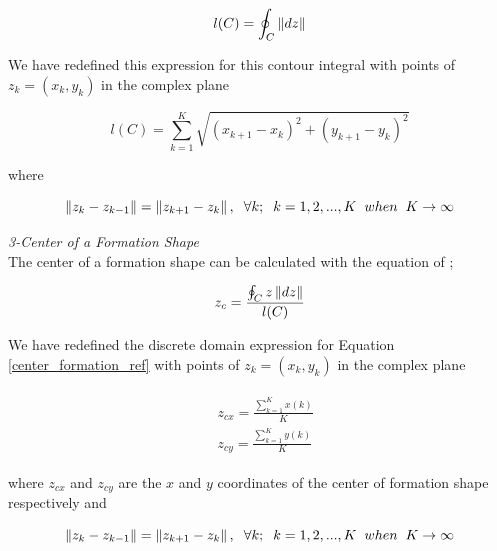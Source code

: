 \begin{equation}
l(C)= \oint_C \left\lVert dz\right\rVert
\end{equation}
		
We have redefined this expression for this contour integral with points of   $z_k = (x_k,y_k)$ in the complex plane

\begin{equation}
l(C) = \sum_{k=1}^{K}\sqrt{(x_{k+1} - x_k)^2 + (y_{k+1} - y_k)^2}
\end{equation}

where

\begin{equation}
\left\lVert z_k - z_{k-1}\right\rVert = \left\lVert z_{k+1} - z_k\right\rVert, \hspace{0.2cm}  \forall k ;  \hspace{0.2cm} k=1,2,...,K \hspace{0.2cm} when  \hspace{0.2cm} K \to\infty
\end{equation}
		
\textit{ 	3-Center of a Formation Shape} \\ 	
The center of a formation shape can be calculated with the equation of \cite{17};

\begin{equation} \label{center_formation_ref}
 z_c = \frac{\oint_C z\left\lVert dz\right\rVert}{l(C)}
\end{equation}
		
We have redefined the discrete domain expression for Equation \ref{center_formation_ref} with points of  $z_k = (x_k,y_k)$ in the complex plane

\begin{align}
\begin{split}
&z_{cx} = \frac{\sum_{k=1}^{K}x(k)}{K}  \\
&z_{cy} = \frac{\sum_{k=1}^{K}y(k)}{K}  
\end{split}
\end{align}
		
where $z_{cx}$ and $z_{cy}$ are the $x$ and $y$ coordinates of the center of formation shape respectively and

\begin{equation}
\left\lVert z_k - z_{k-1}\right\rVert = \left\lVert z_{k+1} - z_k\right\rVert, \hspace{0.2cm}  \forall k ;  \hspace{0.2cm} k=1,2,...,K \hspace{0.2cm} when  \hspace{0.2cm} K \to\infty
\end{equation}

